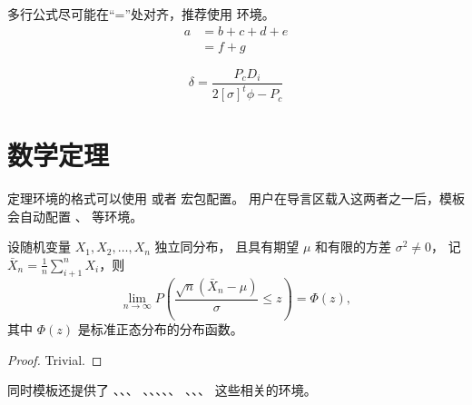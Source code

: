 多行公式尽可能在“=”处对齐，推荐使用  环境。
\begin{align}
  a & = b + c + d + e \\
    & = f + g
\end{align}

 $$ \delta = \frac{P_c D_i}{2[\sigma]^t \phi - P_c } $$

\section{数学定理}

定理环境的格式可以使用  或者  宏包配置。
用户在导言区载入这两者之一后，模板会自动配置 、 等环境。

\begin{theorem}
  设随机变量 $X_1, X_2, \dots, X_n$ 独立同分布， 且具有期望 $\mu$ 和有限的方差 $\sigma^2 \ne 0$，
  记 $\bar{X}_n = \frac{1}{n} \sum_{i+1}^n X_i$，则
  \begin{equation}
    \lim_{n \to \infty} P \left(\frac{\sqrt{n} \left( \bar{X}_n - \mu \right)}{\sigma} \le z \right) = \Phi(z),
  \end{equation}
  其中 $\Phi(z)$ 是标准正态分布的分布函数。
\end{theorem}
\begin{proof}
  Trivial.
\end{proof}

同时模板还提供了 、、、
、、、、、
、、、 这些相关的环境。
